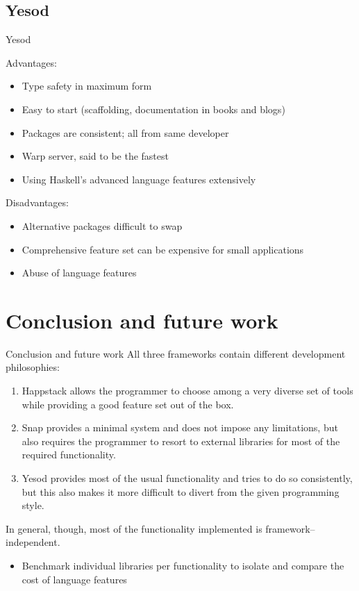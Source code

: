 \documentclass[10pt,usenames,dvipsnames]{beamer}
\begin{document}
	\subsection{Yesod}
	
	\begin{frame}{Yesod}
		
		Advantages:
		\begin{itemize}
			\item Type safety in maximum form
			\item Easy to start (scaffolding, documentation in books and blogs)
			\item Packages are consistent; all from same developer
			\item Warp server, said to be the fastest
			\item Using Haskell's advanced language features extensively
		\end{itemize}
		\pause
		Disadvantages:	
		\begin{itemize}
			\item Alternative packages difficult to swap
			\item Comprehensive feature set can be expensive for small applications
			\item Abuse of language features
		\end{itemize}
		
	\end{frame}
		
	\section{Conclusion and future work}
	
	\begin{frame}{Conclusion and future work}
	All three frameworks contain different development philosophies: 

	\begin{enumerate}
		\item Happstack allows the programmer to choose among a very diverse set of tools while providing a good feature set out of the box.
		\pause \item Snap provides a minimal system and does not impose any limitations, but also requires the programmer to resort to external libraries for most of the required functionality.
		\pause \item Yesod provides most of the usual functionality and tries to do so consistently, but this also makes it more difficult to divert from the given programming style.
	\end{enumerate}
	\pause
	In general, though, most of the functionality implemented is framework--independent.
	\begin{itemize}
		\item Benchmark individual libraries per functionality to isolate and compare the cost of language features
	\end{itemize}
	\end{frame}
	
\end{document}
